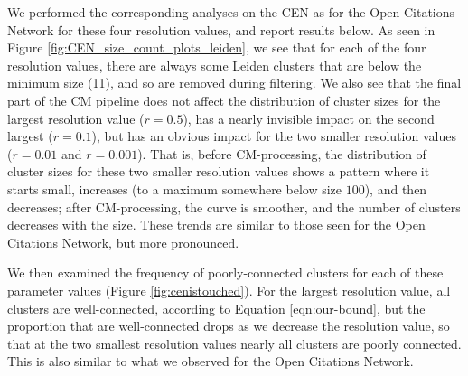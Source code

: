 \documentclass[11pt]{article}   	%
\begin{document}
We performed the corresponding analyses on the CEN as for the Open Citations Network for these four resolution values, and report results below.
As seen in Figure \ref{fig:CEN_size_count_plots_leiden}, we see that  for each of the four resolution values, there are always some Leiden clusters  that are below
the minimum size (11), and so are removed during filtering. We also see that  the final part of the CM pipeline does not affect the distribution of cluster sizes for the
largest resolution value ($r=0.5$), has a nearly invisible impact on the second largest ($r=0.1$), but has an obvious impact for the two smaller resolution values
($r=0.01$ and $r=0.001$).
That is, before CM-processing, the distribution of cluster sizes for these two smaller resolution values shows a pattern where it starts small, increases (to a maximum somewhere
below size $100$), and then decreases; after CM-processing, the curve is smoother, and the number of clusters  decreases with the size.
These trends are similar to those seen for the Open Citations Network, but more pronounced.

We then examined the frequency of poorly-connected clusters for each of these parameter values (Figure \ref{fig:cenistouched}).
For the largest resolution value, all clusters are well-connected, according to Equation \ref{eqn:our-bound}, but the proportion that are well-connected drops as we decrease the resolution value, so that at the two smallest resolution values nearly all clusters are poorly connected.
This is also similar to what we observed for the Open Citations Network.
\end{document}
